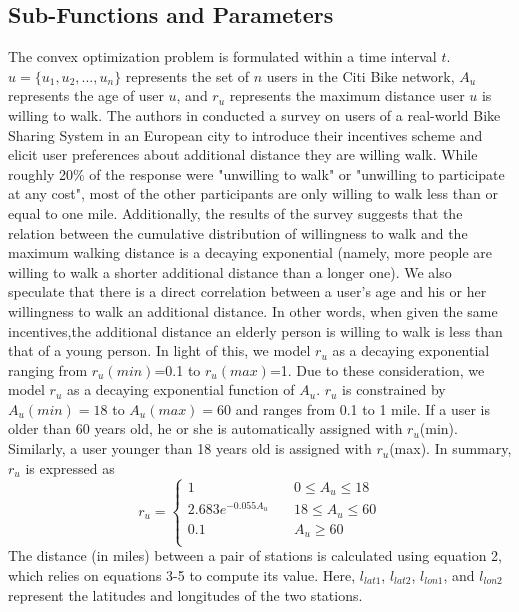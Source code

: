 \documentclass[times, 10pt,twocolumn]{article}
\begin{document}
\subsection{Sub-Functions and Parameters}

The convex optimization problem is formulated within a time interval $t$. $u = \{u_1, u_2, ..., u_n\}$ represents the set of $n$ users in the Citi Bike network, $A_u$ represents the age of user $u$, and $r_u$ represents the maximum distance user $u$ is willing to walk. The authors in \cite{incentives} conducted a survey on users of a real-world Bike Sharing System in an European city to introduce their incentives scheme and elicit user preferences about additional distance they are willing walk. While roughly 20\% of the response were "unwilling to walk" or "unwilling to participate at any cost", most of the other participants are only willing to walk less than or equal to one mile. Additionally, the results of the survey suggests that the relation between the cumulative distribution of willingness to walk and the maximum walking distance is a decaying exponential (namely, more people are willing to walk a shorter additional distance than a longer one). We also speculate that there is a direct correlation between a user's age and his or her willingness to walk an additional distance. In other words, when given the same incentives,the additional distance an elderly person is willing to walk is less than that of a young person. In light of this, we model $r_u$ as a decaying exponential ranging from $r_u(min)$=0.1 to $r_u(max)$=1. Due to these consideration, we model $r_u$ as a decaying exponential function of $A_u$. $r_u$ is constrained by $A_u(min)=18$ to $A_u(max)=60$ and ranges from 0.1 to 1 mile. If a user is older than 60 years old, he or she is automatically assigned with $r_u$(min). Similarly, a user younger than 18 years old is assigned with $r_u$(max). In summary, $r_u$ is expressed as
\begin{equation}
r_u = \left\{
        \begin{array}{lll}
            1 & \quad 0 \leq A_u \leq 18 \\
            2.683e^{-0.055A_u} & \quad 18 \leq A_u \leq 60 \\
            0.1 & \quad A_u \geq 60 \\
        \end{array}
    \right.
\end{equation}
The distance (in miles) between a pair of stations is calculated using equation 2, which relies on equations 3-5 to compute its value. Here, $l_{lat1}$, $l_{lat2}$, $l_{lon1}$, and $l_{lon2}$ represent the latitudes and longitudes of the two stations.
\end{document}
